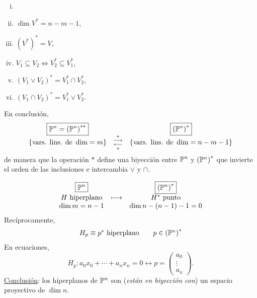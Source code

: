 \begin{obs}
    \begin{enumerate}[i)]
        \item []
        \item $\dim V^* = n-m-1$,
        \item $\left(V^*\right)^*=V$,
        \item $V_1 \subseteq V_2 \iff V_2^* \subseteq V_1^*$,
        \item $\left(V_1 \vee V_2 \right)^* = V_1^* \cap V_2^*$,
        \item $\left(V_1 \cap V_2 \right) ^*=V_1^* \vee V_2^*$.
    \end{enumerate}
    \vspace{0,3cm}
    \noindent En conclusión,
    \[
        \begin{array}{ccc}
             \boxed{\mathbb{P}^n = \left(\mathbb{P}^n\right)^{**}} & & \boxed{\left( \mathbb{P}^n \right)^*}\\
             \left\{\text{vars. lins. de }\dim = m \right\} & \substack{* \\ \longrightarrow \\  \longleftarrow \\ *} & \left\{\text{vars. lins. de }\dim = n-m-1 \right\}
        \end{array}
    \]
    de manera que la operación $*$ define una biyección entre $\mathbb{P}^n$ y $\left( \mathbb{P}^n \right)^*$ que invierte el orden de las inclusiones e intercambia $\vee$ y $\cap$.
\end{obs}
\begin{obs}
    \[
        \begin{array}{ccc}
             \boxed{\mathbb{P}^n} & & \boxed{\left( \mathbb{P}^n \right)^*}\\
             H \text{ hiperplano} & \longmapsto & H^* \text{ punto}\\
             \dim m=n-1 & & \dim n-(n-1)-1=0
        \end{array}
    \]
    Recíprocamente,
    \[
        \begin{array}{ccc}
            H_p \equiv p^* \text{ hiperplano} &  & p\in \left(\mathbb{P}^n\right) ^*
        \end{array}
    \]
    En ecuaciones,
    \[
        H_p \colon a_0x_0+\cdots+a_nx_n=0 \longleftrightarrow p=\begin{pmatrix} a_0 \\ \vdots \\ a_n \end{pmatrix}.
    \]
    \underline{Conclusión}: los hiperplanos de $\mathbb{P}^n$ son (\textit{están en biyección con}) un espacio proyectivo de $\dim n$.
\end{obs}

